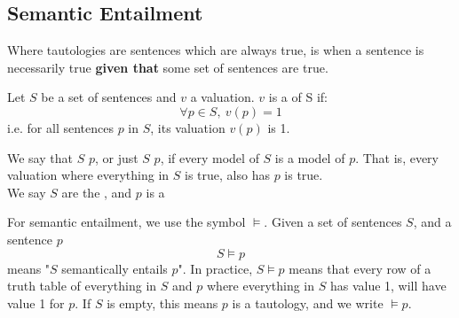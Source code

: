\documentclass[11pt]{article}
\begin{document}
\subsection{Semantic Entailment}
Where tautologies are sentences which are always true,  is when a sentence is necessarily true \textbf{given that} some set of sentences are true. 
\begin{defi}[Model]
    Let $S$ be a set of sentences and $v$ a valuation. $v$ is a  of S if:
    \[\forall p \in S, \ v(p) = 1 \] 
    i.e. for all sentences $p$ in $S$, its valuation $v(p)$ is 1.
\end{defi}
\begin{defi}
    We say that $S$  $p$, or just $S$  $p$, if every model of $S$ is a model of $p$. That is, every valuation where everything in $S$ is true, also has $p$ is true.
    \\ We say $S$ are the , and $p$ is a 
\end{defi}
For semantic entailment, we use the symbol $\vDash$. Given a set of sentences $S$, and a sentence $p$ 
\[ S \vDash p \]
means "$S$ semantically entails $p$". In practice, $S \vDash p$ means that every row of a truth table of everything in $S$ and $p$ where everything in $S$ has value 1, will have value 1 for $p$. If $S$ is empty, this means $p$ is a tautology, and we write $\vDash p$.
\end{document}
